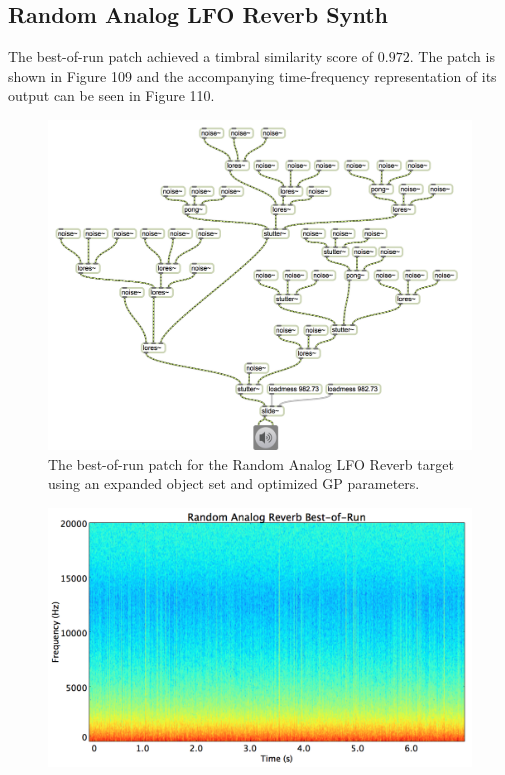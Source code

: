 \documentclass[12pt]{report} 	%
\numberwithin{figure}{chapter}
\numberwithin{table}{chapter}
\numberwithin{equation}{chapter}
\begin{document}
\begin{flushleft}
\vspace{12pt}
\subsection{Random Analog LFO Reverb Synth}

The best-of-run patch achieved a timbral similarity score of $0.972$. The patch is shown in Figure 109 and the accompanying time-frequency representation of its output can be seen in Figure 110.
\begin{figure}[h!]
\begin{center}
\includegraphics[angle=270, scale=0.68]{RandomAnalog_Best}
\caption[Random analog LFO reverb best-of-run patch]{The best-of-run patch for the Random Analog LFO Reverb target using an expanded object set and optimized GP parameters.}
\end{center}
\end{figure}
\begin{figure}[h!]
\begin{center}
\includegraphics[scale=0.32]{RandomAnalogReverbBestOfRunSTFT}

\end{center}
\end{figure}
\end{flushleft}
\end{document}
